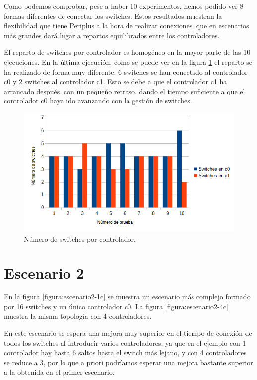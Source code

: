 \documentclass[a4paper, 12pt]{book}
\begin{document}
 	Como podemos comprobar, pese a haber 10 experimentos, hemos podido ver 8 formas diferentes de conectar los switches. Estos resultados muestran la flexibilidad que tiene Periplus a la hora de realizar conexiones, que en escenarios más grandes dará lugar a repartos equilibrados entre los controladores.
 	
 	El reparto de switches por controlador es homogéneo en la mayor parte de las 10 ejecuciones. En la última ejecución, como se puede ver en la figura \ref{figura:switchesporcontrollerescenario1} el reparto se ha realizado de forma muy diferente: 6 switches se han conectado al controlador c0 y 2 switches al controlador c1. Esto se debe a que el controlador c1 ha arrancado después, con un pequeño retraso, dando el tiempo suficiente a que el controlador c0 haya ido avanzando con la gestión de switches. 
 	
 	\begin{figure}[H]
 		\centering
 		\includegraphics[width=16cm, keepaspectratio]{img/switchesporcontrollerescenario1}
 		\caption{Número de switches por controlador.}
 		\label{figura:switchesporcontrollerescenario1}
 	\end{figure}
 	
 	
 	
 	\clearpage
 	\section{Escenario 2}
 	
 	En la figura \ref{figura:escenario2-1c} se muestra un escenario más complejo formado por 16 switches y un único
 	controlador c0. La figura \ref{figura:escenario2-4c} muestra la misma topología con 4 controladores.
 		
 	En este escenario se espera una mejora muy superior en el tiempo de conexión de todos los switches al introducir varios controladores, ya que en el ejemplo con 1 controlador hay hasta 6 saltos hasta el switch más lejano, y con 4 controladores se reduce a 3, por lo que a priori podríamos esperar una mejora bastante superior a la obtenida en el primer escenario.
 	
\end{document}
